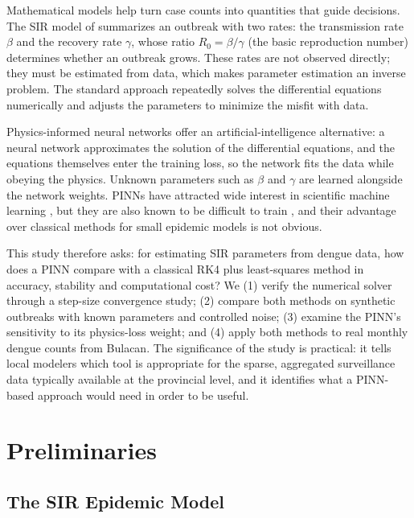 \documentclass[12pt,a4paper]{article}
\newcommand{\Rzero}{R_0}
\begin{document}
Mathematical models help turn case counts into quantities that guide decisions. The SIR model of \citet{kermack1927} summarizes an outbreak with two rates: the transmission rate $\beta$ and the recovery rate $\gamma$, whose ratio $\Rzero=\beta/\gamma$ (the basic reproduction number) determines whether an outbreak grows. These rates are not observed directly; they must be estimated from data, which makes parameter estimation an inverse problem. The standard approach repeatedly solves the differential equations numerically and adjusts the parameters to minimize the misfit with data.

Physics-informed neural networks \citep[PINNs;][]{raissi2019} offer an artificial-intelligence alternative: a neural network approximates the solution of the differential equations, and the equations themselves enter the training loss, so the network fits the data while obeying the physics. Unknown parameters such as $\beta$ and $\gamma$ are learned alongside the network weights. PINNs have attracted wide interest in scientific machine learning \citep{karniadakis2021}, but they are also known to be difficult to train \citep{wang2021}, and their advantage over classical methods for small epidemic models is not obvious.

This study therefore asks: for estimating SIR parameters from dengue data, how does a PINN compare with a classical RK4 plus least-squares method in accuracy, stability and computational cost? We (1) verify the numerical solver through a step-size convergence study; (2) compare both methods on synthetic outbreaks with known parameters and controlled noise; (3) examine the PINN's sensitivity to its physics-loss weight; and (4) apply both methods to real monthly dengue counts from Bulacan. The significance of the study is practical: it tells local modelers which tool is appropriate for the sparse, aggregated surveillance data typically available at the provincial level, and it identifies what a PINN-based approach would need in order to be useful.

\section{Preliminaries}

\subsection{The SIR Epidemic Model}
\end{document}
